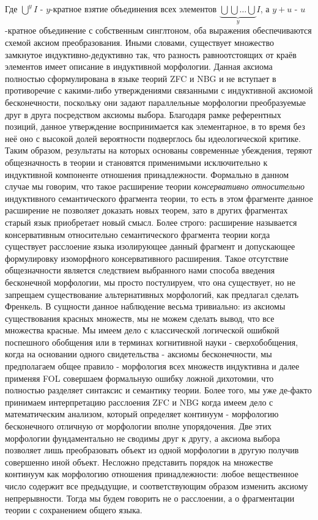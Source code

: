 \documentclass[12pt]{article}
\begin{document}
Где $\bigcup\nolimits^y I$ - $y$-кратное взятие объединения всех элементов $\underbrace{\bigcup \bigcup \dots \bigcup}_{y} I$, а $y + u$ - $u$-кратное объединение с собственным синглтоном, оба выражения обеспечиваются схемой аксиом преобразования. Иными словами, существует множество замкнутое индуктивно-дедуктивно так, что разность равноотстоящих от краёв элементов имеет описание в индуктивной морфологии. Данная аксиома полностью сформулирована в языке теорий ZFC и NBG и не вступает в противоречие с какими-либо утверждениями связанными с индуктивной аксиомой бесконечности, поскольку они задают параллельные морфологии преобразуемые друг в друга посредством аксиомы выбора. Благодаря рамке референтных позиций, данное утверждение воспринимается как элементарное, в то время без неё оно с высокой долей вероятности подверглось бы идеологической критике. Таким образом, результаты на которых основаны современные убеждения, теряют общезначность в теории и становятся применимыми исключительно к индуктивной компоненте отношения принадлежности. Формально в данном случае мы говорим, что такое расширение теории {\it консервативно относительно} индуктивного семантического фрагмента теории, то есть в этом фрагменте данное расширение не позволяет доказать новых теорем, зато в других фрагментах старый язык приобретает новый смысл. Более строго: расширение называется консервативным относительно семантического фрагмента теории когда существует расслоение языка изолирующее данный фрагмент и допускающее формулировку изоморфного консервативного расширения. Такое отсутствие общезначности является следствием выбранного нами способа введения бесконечной морфологии, мы просто постулируем, что она существует, но не запрещаем существование альтернативных морфологий, как предлагал сделать Френкель. В сущности данное наблюдение весьма тривиально: из аксиомы существования красных множеств, мы не можем сделать вывод, что все множества красные. Мы имеем дело с классической логической ошибкой поспешного обобщения или в терминах когнитивной науки - сверхобобщения, когда на основании одного свидетельства - аксиомы бесконечности, мы предполагаем общее правило - морфология всех множеств индуктивна и далее применяя FOL совершаем формальную ошибку ложной дихотомии, что полностью разделяет синтаксис и семантику теории. Более того, мы уже де-факто принимаем интерпретацию расслоения ZFC и NBG когда имеем дело с математическим анализом, который определяет континуум - морфологию бесконечного отличную от морфологии вполне упорядочения. Две этих морфологии фундаментально не сводимы друг к другу, а аксиома выбора позволяет лишь преобразовать объект из одной морфологии в другую получив совершенно иной объект. Несложно представить порядок на множестве континуум как морфологию отношения принадлежности: любое вещественное число содержит все предыдущие, и соответствующим образом изменить аксиому непрерывности. Тогда мы будем говорить не о расслоении, а о фрагментации теории с сохранением общего языка. 
\end{document}
